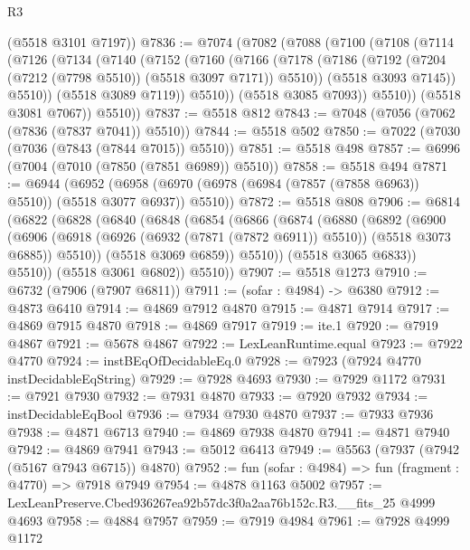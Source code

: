 \begin{lexlean}{R3}
\begin{coremodule}
      (@5518 @3101 @7197))
@7836 := @7074
    (@7082
      (@7088
        (@7100
          (@7108
            (@7114
              (@7126
                (@7134
                  (@7140
                    (@7152
                      (@7160
                        (@7166
                          (@7178
                            (@7186 (@7192 (@7204 (@7212 (@7798 @5510)) (@5518 @3097 @7171)) @5510))
                            (@5518 @3093 @7145))
                          @5510))
                      (@5518 @3089 @7119))
                    @5510))
                (@5518 @3085 @7093))
              @5510))
          (@5518 @3081 @7067))
        @5510))
@7837 := @5518 @812
@7843 := @7048 (@7056 (@7062 (@7836 (@7837 @7041)) @5510))
@7844 := @5518 @502
@7850 := @7022 (@7030 (@7036 (@7843 (@7844 @7015)) @5510))
@7851 := @5518 @498
@7857 := @6996 (@7004 (@7010 (@7850 (@7851 @6989)) @5510))
@7858 := @5518 @494
@7871 := @6944
    (@6952 (@6958 (@6970 (@6978 (@6984 (@7857 (@7858 @6963)) @5510)) (@5518 @3077 @6937)) @5510))
@7872 := @5518 @808
@7906 := @6814
    (@6822
      (@6828
        (@6840
          (@6848
            (@6854
              (@6866
                (@6874
                  (@6880
                    (@6892
                      (@6900
                        (@6906
                          (@6918 (@6926 (@6932 (@7871 (@7872 @6911)) @5510)) (@5518 @3073 @6885))
                          @5510))
                      (@5518 @3069 @6859))
                    @5510))
                (@5518 @3065 @6833))
              @5510))
          (@5518 @3061 @6802))
        @5510))
@7907 := @5518 @1273
@7910 := @6732 (@7906 (@7907 @6811))
@7911 := (sofar : @4984) -> @6380
@7912 := @4873 @6410
@7914 := @4869 @7912 @4870
@7915 := @4871 @7914
@7917 := @4869 @7915 @4870
@7918 := @4869 @7917
@7919 := ite.{1}
@7920 := @7919 @4867
@7921 := @5678 @4867
@7922 := LexLeanRuntime.equal
@7923 := @7922 @4770
@7924 := instBEqOfDecidableEq.{0}
@7928 := @7923 (@7924 @4770 instDecidableEqString)
@7929 := @7928 @4693
@7930 := @7929 @1172
@7931 := @7921 @7930
@7932 := @7931 @4870
@7933 := @7920 @7932
@7934 := instDecidableEqBool
@7936 := @7934 @7930 @4870
@7937 := @7933 @7936
@7938 := @4871 @6713
@7940 := @4869 @7938 @4870
@7941 := @4871 @7940
@7942 := @4869 @7941
@7943 := @5012 @6413
@7949 := @5563 (@7937 (@7942 (@5167 @7943 @6715)) @4870)
@7952 := fun (sofar : @4984) => fun (fragment : @4770) => @7918 @7949
@7954 := @4878 @1163 @5002
@7957 := LexLeanPreserve.Cbed936267ea92b57dc3f0a2aa76b152c.R3.__fits_25 @4999 @4693
@7958 := @4884 @7957
@7959 := @7919 @4984
@7961 := @7928 @4999 @1172

\end{coremodule}
\end{lexlean}
